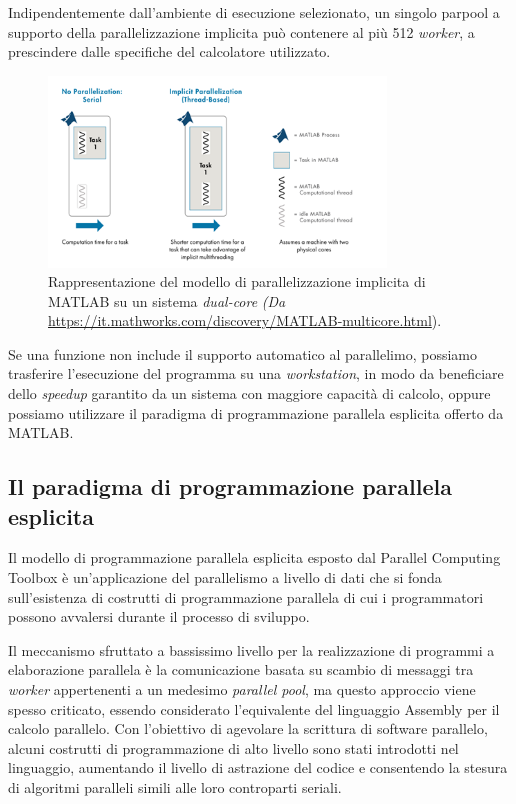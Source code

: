 Indipendentemente dall'ambiente di esecuzione selezionato, un singolo parpool a supporto della parallelizzazione implicita pu\`o contenere al pi\`u 512 \textit{worker}, a prescindere dalle specifiche
del calcolatore utilizzato.
\begin{figure}[htbp]
    \centering
    \includegraphics[width=0.8\textwidth]{../Risorse/Capitolo 2/ImplicitParallelization.png}
    \caption{Rappresentazione del modello di parallelizzazione implicita di MATLAB su un sistema \textit{dual-core}
        \small{\textit{(Da} \url{https://it.mathworks.com/discovery/MATLAB-multicore.html})}.}
    \label{fig:parallelismoImplicito}
\end{figure}\newline
Se una funzione non include il supporto automatico al parallelimo, possiamo trasferire l'esecuzione del programma su una \textit{workstation}, in modo da beneficiare
dello \textit{speedup} garantito da un sistema con maggiore capacit\`a di calcolo, oppure possiamo utilizzare il paradigma di programmazione parallela esplicita offerto
da MATLAB.

\subsection{Il paradigma di programmazione parallela esplicita}

Il modello di programmazione parallela esplicita esposto dal Parallel Computing Toolbox \`e un'applicazione del parallelismo a livello di dati che si fonda sull'esistenza di costrutti di programmazione
parallela di cui i programmatori possono avvalersi durante il processo di sviluppo.

Il meccanismo sfruttato a bassissimo livello per la realizzazione di programmi a elaborazione parallela \`e la comunicazione basata su scambio di messaggi tra \textit{worker}
appertenenti a un medesimo \textit{parallel pool}, ma questo approccio viene spesso criticato, essendo considerato l'equivalente del linguaggio
Assembly per il calcolo parallelo.\newline
Con l'obiettivo di agevolare la scrittura di software parallelo, alcuni costrutti di programmazione di alto livello sono stati introdotti nel linguaggio, aumentando il livello di
astrazione del codice e consentendo la stesura di algoritmi paralleli simili alle loro controparti seriali.

